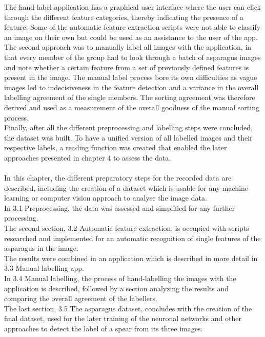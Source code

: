 The hand-label application has a graphical user interface where the user can click through the different feature categories, thereby indicating the presence of a feature. Some of the automatic feature extraction scripts were not able to classify an image on their own but could be used as an assistance to the user of the app. \\
The second approach was to manually label all images with the application, in that every member of the group had to look through a batch of asparagus images and note whether a certain feature from a set of previously defined features is present in the image.
The manual label process bore its own difficulties as vague images led to indecisiveness in the feature detection and a variance in the overall labelling agreement of the single members. The sorting agreement was therefore derived and used as a measurement of the overall goodness of the manual sorting process. \\
Finally, after all the different preprocessing and labelling steps were concluded, the dataset was built. To have a unified version of all labelled images and their respective labels, a reading function was created that enabled the later approaches presented in chapter 4 to assess the data. \\
\\
In this chapter, the different preparatory steps for the recorded data are described, including the creation of a dataset which is usable for any machine learning or computer vision approach to analyse the image data. \\
In 3.1 Preprocessing, the data was assessed and simplified for any further processing. \\
The second section, 3.2 Automatic feature extraction, is occupied with scripts researched and implemented for an automatic recognition of single features of the asparagus in the image. \\
The results were combined in an application which is described in more detail in 3.3 Manual labelling app. \\
In 3.4 Manual labelling, the process of hand-labelling the images with the application is described, followed by a section analyzing the results and comparing the overall agreement of the labellers. \\
The last section, 3.5 The asparagus dataset, concludes with the creation of the final dataset, used for the later training of the neuronal networks and other approaches to detect the label of a spear from its three images.



